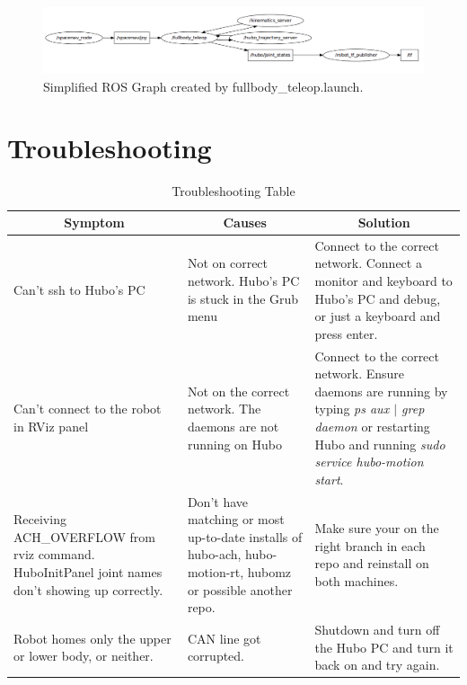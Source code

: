 \documentclass[letterpaper, 10 pt]{report}
\begin{document}
  \begin{figure}[ht]
    \centering
    \includegraphics[width=12.0cm]{figures/teleop-rosgraph}
    \caption{Simplified ROS Graph created by fullbody\_teleop.launch.}
    \label{fig:teleop-rosgraph-image}
  \end{figure}


%
\clearpage
\section{Troubleshooting}\label{sec:troubleshooting}
\begin{table}[ht]
  \centering
  \caption{Troubleshooting Table}
  \begin{tabular}{|p{4.5cm}|p{4.5cm}|p{4.5cm}|} \hline
    \multicolumn{1}{|c|}{Symptom} & \multicolumn{1}{|c|}{Causes} & \multicolumn{1}{|c|}{Solution} \\ \hline
    Can't ssh to Hubo's PC & Not on correct network. \newline Hubo's PC is stuck in the Grub menu & Connect to the correct network. \newline Connect a monitor and keyboard to Hubo's PC and debug, or just a keyboard and press enter. \\
    \hline
    Can't connect to the robot in RViz panel & Not on the correct network. \newline The daemons are not running on Hubo & Connect to the correct network. \newline Ensure daemons are running by typing \textit{ps aux $|$ grep daemon} or restarting Hubo and running \textit{sudo service hubo-motion start}.  \\
    \hline
    Receiving ACH\_OVERFLOW from rviz command. \newline HuboInitPanel joint names don't showing up correctly. & Don't have matching or most up-to-date installs of hubo-ach, hubo-motion-rt, hubomz or possible another repo. & Make sure your on the right branch in each repo and reinstall on both machines. \\
    \hline
    Robot homes only the upper or lower body, or neither. & CAN line got corrupted. & Shutdown and turn off the Hubo PC and turn it back on and try again. \\
    \hline
  \end{tabular} \label{tbl:troubleshooting}
\end{table}


%

\end{document}

